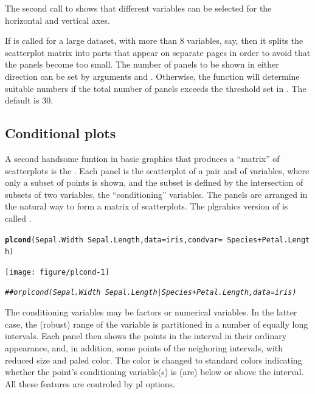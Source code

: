 \documentclass[11pt]{article}\usepackage[]{graphicx}\usepackage[]{color}
\makeatletter
\newcommand{\hlcom}[1]{\textcolor[rgb]{0.678,0.584,0.686}{\textit{#1}}}%
\newcommand{\hlopt}[1]{\textcolor[rgb]{0,0,0}{#1}}%
\newcommand{\hlstd}[1]{\textcolor[rgb]{0.345,0.345,0.345}{#1}}%
\newcommand{\hlkwc}[1]{\textcolor[rgb]{0.333,0.667,0.333}{#1}}%
\newcommand{\hlkwd}[1]{\textcolor[rgb]{0.737,0.353,0.396}{\textbf{#1}}}%
\newenvironment{kframe}{%
 \def\at@end@of@kframe{}%
 \ifinner\ifhmode%
  \def\at@end@of@kframe{\end{minipage}}%
  \begin{minipage}{\columnwidth}%
 \fi\fi%
 \def\FrameCommand##1{\hskip\@totalleftmargin \hskip-\fboxsep
 \colorbox{shadecolor}{##1}\hskip-\fboxsep
     \hskip-\linewidth \hskip-\@totalleftmargin \hskip\columnwidth}%
 \MakeFramed {\advance\hsize-\width
   \@totalleftmargin\z@ \linewidth\hsize
   \@setminipage}}%
 {\par\unskip\endMakeFramed%
 \at@end@of@kframe}
\newenvironment{knitrout}{}{} %
\makeatother
\begin{document}
The second call to  shows that different variables can be
selected for the horizontal and vertical axes. 

If  is called for a large dataset, with more than 8 variables, 
say, then it splits the scatterplot matrix into parts that appear on
separate pages in order to avoid that the panels become too small.
The number of panels to be shown in either direction can be set by 
arguments  and . 
Otherwise, the function will determine suitable numbers 
if the total number of panels exceeds the threshold set in 
. The default is 30.

\subsection{Conditional plots}
A second handsome funtion in basic graphics that produces a ``matrix''
of scatterplots is the . 
Each panel is the scatterplot of a pair  and  of variables,
where only a subset of points is shown, and the subset is defined
by the intersection of subsets of two variables, the ``conditioning''
variables. The panels are arranged in the natural way to form
a matrix of scatterplots.
The plgrahics version of  is called .

\begin{knitrout}
\color{fgcolor}\begin{kframe}
\begin{alltt}
\hlkwd{plcond}\hlstd{(Sepal.Width}\hlopt{~}\hlstd{Sepal.Length,} \hlkwc{data}\hlstd{=iris,} \hlkwc{condvar}\hlstd{=}\hlopt{~}\hlstd{Species}\hlopt{+}\hlstd{Petal.Length)}
\end{alltt}
\end{kframe}
\texttt{[image: figure/plcond-1]} 
\begin{kframe}\begin{alltt}
\hlcom{## or  plcond(Sepal.Width~Sepal.Length | Species+Petal.Length, data=iris)}
\end{alltt}
\end{kframe}
\end{knitrout}
The conditioning variables may be factors or numerical variables.
In the latter case, the (robust) range of the variable is partitioned
in a number of equally long intervals. 
Each panel then shows the points in the interval in their ordinary appearance,
and, in addition, some points of the neighoring intervals, with reduced size
and paled color. The color is changed to standard colors indicating whether 
the point's conditioning variable(s) is (are) below or above the interval.
All these features are controled by pl options.
\end{document}
